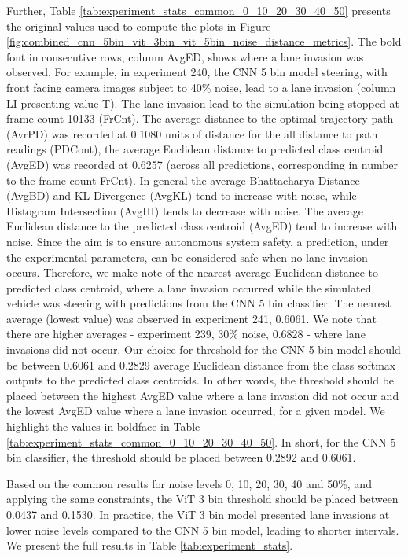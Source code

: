Further, Table \ref{tab:experiment_stats_common_0_10_20_30_40_50} presents the original values used to compute the plots in Figure \ref{fig:combined_cnn_5bin_vit_3bin_vit_5bin_noise_distance_metrics}. The bold font in consecutive rows, column AvgED, shows where a lane invasion was observed. For example, in experiment 240, the CNN 5 bin model steering, with front facing camera images subject to 40\% noise, lead to a lane invasion (column LI presenting value T). The lane invasion lead to the simulation being stopped at frame count 10133 (FrCnt). The average distance to the optimal trajectory path (AvrPD) was recorded at 0.1080 units of distance for the all distance to path readings (PDCont), the average Euclidean distance to predicted class centroid (AvgED) was recorded at 0.6257 (across all predictions, corresponding in number to the frame count FrCnt). In general the average Bhattacharya Distance (AvgBD) and KL Divergence (AvgKL) tend to increase with noise, while Histogram Intersection (AvgHI) tends to decrease with noise.
The average Euclidean distance to the predicted class centroid (AvgED) tend to increase with noise. 
Since the aim is to ensure autonomous system safety, a prediction, under the experimental parameters, can be considered safe when no lane invasion occurs. Therefore, we make note of the nearest average Euclidean distance to predicted class centroid, where a lane invasion occurred while the simulated vehicle was steering with predictions from the CNN 5 bin classifier. The nearest average (lowest value) was observed in experiment 241, 0.6061. We note that there are higher averages - experiment 239, 30\% noise, 0.6828 - where lane invasions did not occur. Our choice for threshold for the CNN 5 bin model should be between 0.6061 and 0.2829 average Euclidean distance from the class softmax outputs to the predicted class centroids. In other words, the threshold should be placed between the highest AvgED value where a lane invasion did not occur and the lowest AvgED value where a lane invasion occurred, for a given model. We highlight the values in boldface in Table \ref{tab:experiment_stats_common_0_10_20_30_40_50}. In short, for the CNN 5 bin classifier, the threshold should be placed between 0.2892 and 0.6061.

Based on the common results for noise levels 0, 10, 20, 30, 40 and 50\%, and applying the same constraints, the ViT 3 bin threshold should be placed between 0.0437 and 0.1530. In practice, the ViT 3 bin model presented lane invasions at lower noise levels compared to the CNN 5 bin model, leading to shorter intervals. 
We present the full results in Table \ref{tab:experiment_stats}.


